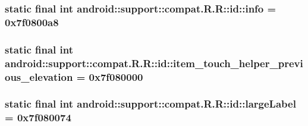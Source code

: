 \hypertarget{classandroid_1_1support_1_1compat_1_1_r_1_1id_f3aa41c13fe29122ba053325da9553cf}{
\subsubsection[{info}]{\setlength{\rightskip}{0pt plus 5cm}static final int android::support::compat.R.R::id::info = 0x7f0800a8}}
\label{classandroid_1_1support_1_1compat_1_1_r_1_1id_f3aa41c13fe29122ba053325da9553cf}


\hypertarget{classandroid_1_1support_1_1compat_1_1_r_1_1id_af782b150104c8bc665e83ea8ade3677}{
\subsubsection[{item\_\-touch\_\-helper\_\-previous\_\-elevation}]{\setlength{\rightskip}{0pt plus 5cm}static final int android::support::compat.R.R::id::item\_\-touch\_\-helper\_\-previous\_\-elevation = 0x7f080000}}
\label{classandroid_1_1support_1_1compat_1_1_r_1_1id_af782b150104c8bc665e83ea8ade3677}


\hypertarget{classandroid_1_1support_1_1compat_1_1_r_1_1id_3b411fafac92856e261ea67cd0e548b3}{
\subsubsection[{largeLabel}]{\setlength{\rightskip}{0pt plus 5cm}static final int android::support::compat.R.R::id::largeLabel = 0x7f080074}}
\label{classandroid_1_1support_1_1compat_1_1_r_1_1id_3b411fafac92856e261ea67cd0e548b3}


